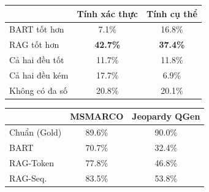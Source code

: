 \documentclass[10pt,letterpaper]{article}
\begin{document}
\begin{table}[t]
\centering
\begin{minipage}[t]{0.47\textwidth}
  \label{tab:human}
  \vspace{2pt}
  \centering\small
  \begin{tabular}{@{}lcc@{}}
    \toprule
     & Tính xác thực & Tính cụ thể\\
    \midrule
    BART tốt hơn & 7.1\% & 16.8\%\\
    RAG tốt hơn & \textbf{42.7\%} & \textbf{37.4\%}\\
    Cả hai đều tốt & 11.7\% & 11.8\%\\
    Cả hai đều kém & 17.7\% & 6.9\%\\
    Không có đa số & 20.8\% & 20.1\%\\
    \bottomrule
  \end{tabular}
\end{minipage}\hfill
\begin{minipage}[t]{0.49\textwidth}
  \label{tab:diversity}
  \vspace{2pt}
  \centering\small
  \begin{tabular}{@{}lcc@{}}
    \toprule
     & MSMARCO & Jeopardy QGen\\
    \midrule
    Chuẩn (Gold) & 89.6\% & 90.0\%\\
    BART & 70.7\% & 32.4\%\\
    RAG-Token & 77.8\% & 46.8\%\\
    RAG-Seq. & 83.5\% & 53.8\%\\
    \bottomrule
  \end{tabular}
\end{minipage}


\end{table}
\end{document}
